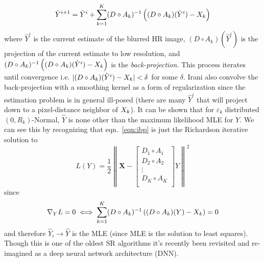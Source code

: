 \begin{equation}
	\hat{Y}^{i+1} = \hat{Y}^i + \sum_{k=1}^K (D \circ A_k)^{-1}\left( (D \circ A_k)(\hat{Y}^i) - \Xk \right)
	\label{eqn:ibp}
\end{equation}
where $\hat{Y}^i$ is the current estimate of the blurred HR image, $(D \circ A_k)(\hat{Y}^i)$ is the projection of the current estimate to low resolution, and $(D \circ A_k)^{-1}\left( (D \circ A_k)(\hat{Y}^i) - X_k \right)$ is the \textit{back-projection}.
%
This process iterates until convergence i.e. $\lvert (D \circ A_k)(\hat{Y}^i) - X_k \rvert < \delta$ for some $\delta$.
%
Irani \etal\cite{Irani1991ImprovingRB} also convolve the back-projection with a smoothing kernel as a form of regularization since the estimation problem is in general ill-posed (there are many $\hat{Y}^{i}$ that will project down to a pixel-distance neighbor of $X_k$).
%
It can be shown\cite{Elad1996} that for $\varepsilon_k$ distributed $(0, R_k)$-Normal, $\hat{Y}$ is none other than the maximum likelihood MLE for $Y$.
%
We can see this by recognizing that eqn.~\eqref{eqn:ibp} is just the Richardson iterative\cite{Anderssen:1972:RNM:891962} solution to
\begin{equation}
	L(Y) = \frac{1}{2} \left\| \bm{X} -  \begin{bmatrix}
		D_1 \circ A_1 \\
		D_2 \circ A_2 \\
		\vdots        \\
		D_K \circ A_K \\
	\end{bmatrix}  Y  \right\|^2
	\label{eqn:l2regression}
\end{equation}
since
\begin{equation*}
	\nabla_{Y} L = 0
	\iff
	\sum_{k=1}^K (D \circ A_k)^{-1}\left( (D \circ A_k)(Y) - X_k \right) = 0
\end{equation*}
and therefore $\hat{Y}_i \rightarrow \hat{Y}$ is the MLE (since MLE is the solution to least squares\cite{CaseBerg:01}).
%
Though this is one of the oldest SR algorithms it's recently been revisited and re-imagined as a deep neural network architecture (DNN)\cite{DBLP:journals.corr.abs-1803-02735}.
